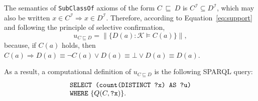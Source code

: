 \documentclass{sig-alternate}
\begin{document}
The semantics of \texttt{SubClassOf} axioms of the form $C~\sqsubseteq~D$ is $C^\mathcal{I} \subseteq D^\mathcal{I}$,
which may also be written $x \in C^\mathcal{I} \Rightarrow x \in D^\mathcal{I}$.
Therefore, according to Equation~\ref{eq:support} and
following the principle of selective confirmation,
\begin{equation}
  u_{C \sqsubseteq D} = \| \{D(a) : \mathcal{K} \models C(a) \} \|,
\end{equation}
because, if $C(a)$ holds, then $C(a) \Rightarrow D(a) \equiv \neg C(a) \lor D(a) \equiv \bot \lor D(a) \equiv D(a)$.

\noindent
As a result, a computational definition of $u_{C \sqsubseteq D}$ is the following SPARQL query:
\begin{equation}\label{eq:query-refc}
  \begin{minipage}[c]{5in}
    \begin{tabbing}
      \quad\=\quad\=\quad\=\kill
      \texttt{SELECT (count(DISTINCT ?x) AS ?u)}\\
      \texttt{WHERE} \{$Q(C, \mbox{\tt ?x})$\}.
    \end{tabbing}
  \end{minipage}
\end{equation}
\end{document}
